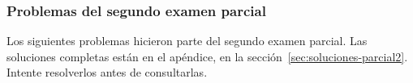 %
%
%

\subsubsection{Problemas del segundo examen parcial}
\label{sec:problemas-parcial2}

Los siguientes problemas hicieron parte del segundo examen parcial. Las
soluciones completas están en el apéndice, en la
sección~\ref{sec:soluciones-parcial2}. Intente resolverlos antes de
consultarlas.

